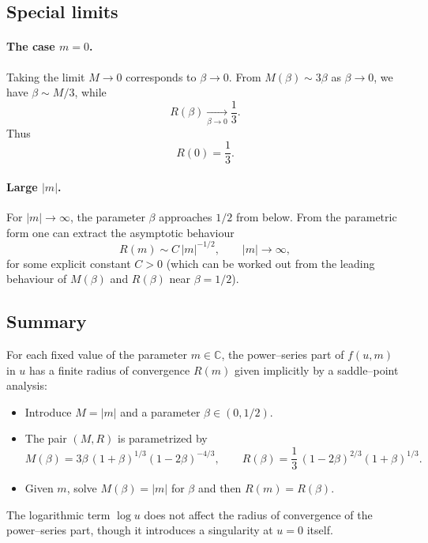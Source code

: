 \documentclass[11pt, a4paper]{article}
\numberwithin{equation}{section}
\begin{document}
\subsection{Special limits}
\paragraph{The case $m=0$.}
Taking the limit $M\to 0$ corresponds to $\beta\to 0$. From
$M(\beta)\sim 3\beta$ as $\beta\to 0$, we have $\beta\sim M/3$, while
\begin{equation}
  R(\beta)\xrightarrow[\beta\to 0]{}\frac{1}{3}.
\end{equation}
Thus
\begin{equation}
  R(0) = \frac{1}{3}.
\end{equation}

\paragraph{Large \texorpdfstring{$|m|$}{|m|}.}
For $|m|\to\infty$, the parameter $\beta$ approaches $1/2$ from below. From the
parametric form one can extract the asymptotic behaviour
\begin{equation}
  R(m) \sim C\,|m|^{-1/2},
  \qquad |m|\to\infty,
\end{equation}
for some explicit constant $C>0$ (which can be worked out from the leading
behaviour of $M(\beta)$ and $R(\beta)$ near $\beta=1/2$).

\subsection{Summary}
For each fixed value of the parameter $m\in\mathbb{C}$, the power--series part
of $f(u,m)$ in $u$ has a finite radius of convergence $R(m)$ given implicitly
by a saddle--point analysis:
\begin{itemize}
  \item Introduce $M=|m|$ and a parameter $\beta\in(0,1/2)$.
  \item The pair $(M,R)$ is parametrized by
  \begin{equation}
    M(\beta) = 3\beta\,(1+\beta)^{1/3}(1-2\beta)^{-4/3},\qquad
    R(\beta) = \frac{1}{3}\,(1-2\beta)^{2/3}(1+\beta)^{1/3}.
  \end{equation}
  \item Given $m$, solve $M(\beta)=|m|$ for $\beta$ and then
  $R(m)=R(\beta)$.
\end{itemize}
The logarithmic term $\log u$ does not affect the radius of convergence of the
power--series part, though it introduces a singularity at $u=0$ itself.
\end{document}
